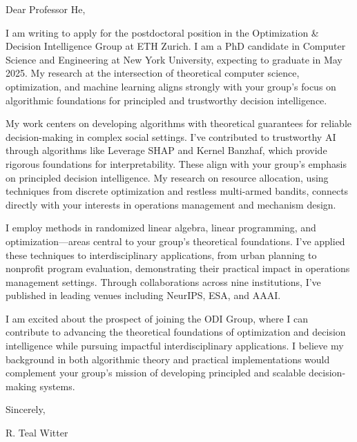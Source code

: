 \documentclass[11pt]{article}
\begin{document}
{\setlength{\parindent}{0cm}

Dear Professor He,

I am writing to apply for the postdoctoral position in the Optimization \& Decision Intelligence Group at ETH Zurich. I am a PhD candidate in Computer Science and Engineering at New York University, expecting to graduate in May 2025. My research at the intersection of theoretical computer science, optimization, and machine learning aligns strongly with your group's focus on algorithmic foundations for principled and trustworthy decision intelligence.

My work centers on developing algorithms with theoretical guarantees for reliable decision-making in complex social settings. I've contributed to trustworthy AI through algorithms like Leverage SHAP and Kernel Banzhaf, which provide rigorous foundations for interpretability. These align with your group's emphasis on principled decision intelligence. My research on resource allocation, using techniques from discrete optimization and restless multi-armed bandits, connects directly with your interests in operations management and mechanism design.

I employ methods in randomized linear algebra, linear programming, and optimization—areas central to your group's theoretical foundations. I've applied these techniques to interdisciplinary applications, from urban planning to nonprofit program evaluation, demonstrating their practical impact in operations management settings. Through collaborations across nine institutions, I've published in leading venues including NeurIPS, ESA, and AAAI.

I am excited about the prospect of joining the ODI Group, where I can contribute to advancing the theoretical foundations of optimization and decision intelligence while pursuing impactful interdisciplinary applications. I believe my background in both algorithmic theory and practical implementations would complement your group's mission of developing principled and scalable decision-making systems.

Sincerely,

\vspace{1em}

{\bsifamily R. Teal Witter}

}
\end{document}
